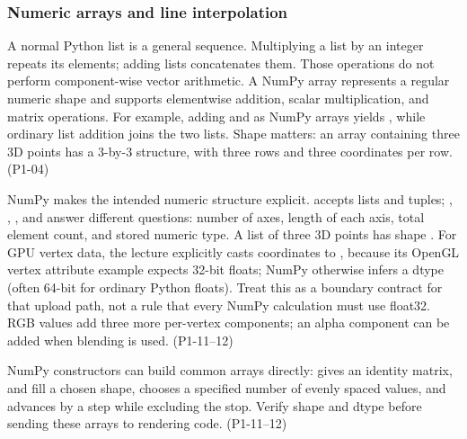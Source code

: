 \subsubsection{Numeric arrays and line interpolation}\label{03-visual-computing-i-ch018-numeric-arrays-and-line-interpolation}

\hypertarget{03-visual-computing-i-ch018-numeric-arrays-and-line-interpolation}{}

A normal Python list is a general sequence. Multiplying a list by an integer repeats its elements; adding lists concatenates them. Those operations do not perform component-wise vector arithmetic. A NumPy array represents a regular numeric shape and supports elementwise addition, scalar multiplication, and matrix operations. For example, adding \BookInlineCode{{{[}}{1}{,}{\ }{2}{,}{\ }{3}{{]}}}{{[}1,\ 2,\ 3{]}} and \BookInlineCode{{{[}}{4}{,}{\ }{5}{,}{\ }{6}{{]}}}{{[}4,\ 5,\ 6{]}} as NumPy arrays yields \BookInlineCode{{{[}}{5}{,}{\ }{7}{,}{\ }{9}{{]}}}{{[}5,\ 7,\ 9{]}}, while ordinary list addition joins the two lists. Shape matters: an array containing three 3D points has a 3-by-3 structure, with three rows and three coordinates per row. (P1-04)

NumPy makes the intended numeric structure explicit.  accepts lists and tuples; , , , and  answer different questions: number of axes, length of each axis, total element count, and stored numeric type. A list of three 3D points has shape . For GPU vertex data, the lecture explicitly casts coordinates to , because its OpenGL vertex attribute example expects 32-bit floats; NumPy otherwise infers a dtype (often 64-bit for ordinary Python floats). Treat this as a boundary contract for that upload path, not a rule that every NumPy calculation must use float32. RGB values add three more per-vertex components; an alpha component can be added when blending is used. (P1-11--12)

NumPy constructors can build common arrays directly:  gives an identity matrix,  and  fill a chosen shape,  chooses a specified number of evenly spaced values, and  advances by a step while excluding the stop. Verify shape and dtype before sending these arrays to rendering code. (P1-11--12)


